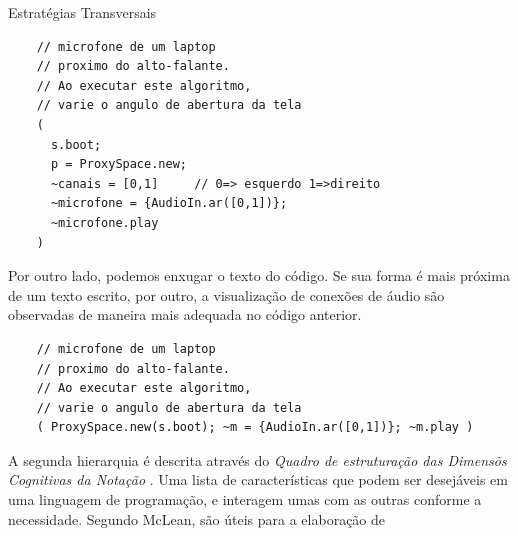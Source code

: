 \begin{example}{Estratégias Transversais}


  \begin{verbatim}
    // microfone de um laptop 
    // proximo do alto-falante.
    // Ao executar este algoritmo, 
    // varie o angulo de abertura da tela
    ( 
      s.boot;
      p = ProxySpace.new;
      ~canais = [0,1]     // 0=> esquerdo 1=>direito
      ~microfone = {AudioIn.ar([0,1])};
      ~microfone.play
    )
  \end{verbatim}

  Por outro lado, podemos enxugar o texto do código. Se sua forma é mais próxima de um texto escrito, por outro, a visualização de conexões de áudio são observadas de maneira mais adequada no código anterior.

  \begin{verbatim}
    // microfone de um laptop 
    // proximo do alto-falante.
    // Ao executar este algoritmo, 
    // varie o angulo de abertura da tela
    ( ProxySpace.new(s.boot); ~m = {AudioIn.ar([0,1])}; ~m.play )
  \end{verbatim}
\end{example}\label{ex:sc1}

A segunda hierarquia é descrita através do \emph{Quadro de estruturação das Dimensõs Cognitivas da Notação} . Uma lista de características que podem ser desejáveis em uma linguagem de programação, e interagem umas com as outras conforme a necessidade. Segundo McLean, são úteis para a elaboração de 

